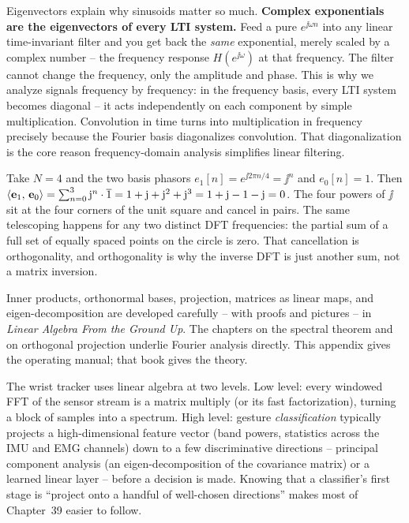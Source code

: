\begin{aestheticbox}
Eigenvectors explain why sinusoids matter so much. \textbf{Complex exponentials are the
eigenvectors of every LTI system.} Feed a pure $e^{\jj\omega n}$ into any linear time-invariant
filter and you get back the \emph{same} exponential, merely scaled by a complex number -- the
frequency response $H(e^{\jj\omega})$ at that frequency. The filter cannot change the frequency,
only the amplitude and phase. This is why we analyze signals frequency by frequency: in the
frequency basis, every LTI system becomes diagonal -- it acts independently on each component by
simple multiplication. Convolution in time turns into multiplication in frequency precisely
because the Fourier basis diagonalizes convolution. That diagonalization is the core reason frequency-domain analysis simplifies linear filtering.
\end{aestheticbox}

\begin{example}
\label{ch42:ex-dft-orth}
Take $N = 4$ and the two basis phasors $e_1[n] = e^{\jj 2\pi n/4} = \jj^n$ and $e_0[n] = 1$. Then
$\langle \mathbf{e}_1,\, \mathbf{e}_0 \rangle = \sum_{n=0}^{3} \mathrm{j}^n\cdot\overline 1 = 1 + \mathrm{j} + \mathrm{j}^2 + \mathrm{j}^3 = 1
+ \mathrm{j} - 1 - \mathrm{j} = 0$. The four powers of $\jj$ sit at the four corners of the unit square and
cancel in pairs. The same telescoping happens for any two distinct DFT frequencies: the partial
sum of a full set of equally spaced points on the circle is zero. That cancellation is
orthogonality, and orthogonality is why the inverse DFT is just another sum, not a matrix
inversion.
\end{example}

\begin{connectionbox}
Inner products, orthonormal bases, projection, matrices as linear maps, and eigen-decomposition
are developed carefully -- with proofs and pictures -- in \emph{Linear Algebra From the Ground
Up}. The chapters on the spectral theorem and on orthogonal projection underlie Fourier
analysis directly. This appendix gives the operating manual; that book gives the theory.
\end{connectionbox}

\begin{goalbox}
The wrist tracker uses linear algebra at two levels. Low level: every windowed FFT of the sensor
stream is a matrix multiply (or its fast factorization), turning a block of samples into a
spectrum. High level: gesture \emph{classification} typically projects a high-dimensional feature
vector (band powers, statistics across the IMU and EMG channels) down to a few discriminative
directions -- principal component analysis (an eigen-decomposition of the covariance matrix) or a
learned linear layer -- before a decision is made. Knowing that a classifier's first stage is
``project onto a handful of well-chosen directions'' makes most of Chapter~39 easier to follow.
\end{goalbox}

